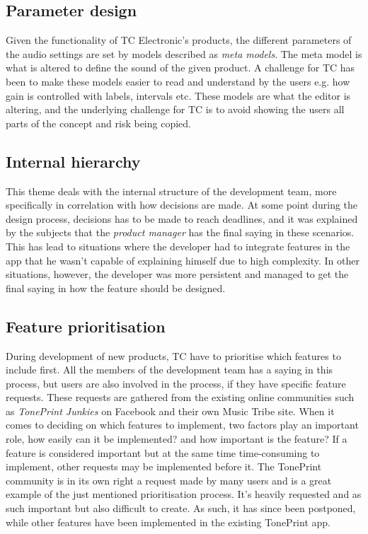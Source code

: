 \subsection*{Parameter design}
\label{App:ThemeParameterDesign}
Given the functionality of TC Electronic's products, the different parameters of the audio settings are set by models described as \textit{meta models}. The meta model is what is altered to define the sound of the given product. A challenge for TC has been to make these models easier to read and understand by the users e.g. how gain is controlled with labels, intervals etc. These models are what the editor is altering, and the underlying challenge for TC is to avoid showing the users all parts of the concept and risk being copied.

\subsection*{Internal hierarchy}
\label{App:ThemeRollAllocation}
This theme deals with the internal structure of the development team, more specifically in correlation with how decisions are made. At some point during the design process, decisions has to be made to reach deadlines, and it was explained by the subjects that the \textit{product manager} has the final saying in these scenarios. This has lead to situations where the developer had to integrate features in the app that he wasn't capable of explaining himself due to high complexity. In other situations, however, the developer was more persistent and managed to get the final saying in how the feature should be designed.

\subsection*{Feature prioritisation}
\label{ThemePrioritizingOfFeatures}
During development of new products, TC have to prioritise which features to include first. All the members of the development team has a saying in this process, but users are also involved in the process, if they have specific feature requests. These requests are gathered from the existing online communities such as \textit{TonePrint Junkies} on Facebook and their own Music Tribe site. When it comes to deciding on which features to implement, two factors play an important role, how easily can it be implemented? and how important is the feature? If a feature is considered important but at the same time time-consuming to implement, other requests may be implemented before it. The TonePrint community is in its own right a request made by many users and is a great example of the just mentioned prioritisation process. It's heavily requested and as such important but also difficult to create. As such, it has since been postponed, while other features have been implemented in the existing TonePrint app.

